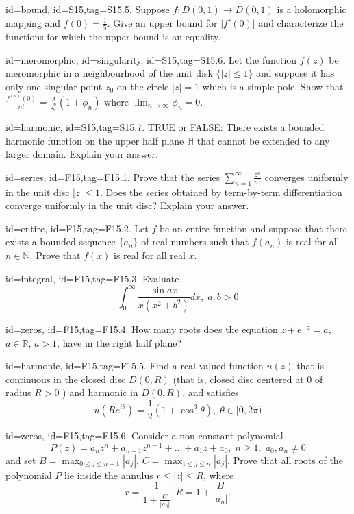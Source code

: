 \documentclass[12pt,letterpaper]{article}
\begin{document}
{\item[id=bound, id=S15,tag=S15.5.]
Suppose $f : D(0,1) \rightarrow D(0,1)$ is a holomorphic mapping and $f(0) = \frac{1}{5}$. Give an upper bound for $| f'(0) |$ and characterize the functions for which the upper bound is an equality.

\item[id=meromorphic, id=singularity, id=S15,tag=S15.6.]
Let the function $f(z)$ be meromorphic in a neighbourhood of the unit disk $\{| z | \le 1\}$ and suppose it has only one singular point $z_0$ on the circle $| z | = 1$ which is a simple pole. Show that $\frac{f^{(n)}(0)}{n!} = \frac{A}{z_0^n}(1 + \phi_n)$ where $\lim_{n\rightarrow \infty} \phi_n = 0$.

\item[id=harmonic, id=S15,tag=S15.7.]
TRUE or FALSE: There exists a bounded harmonic function on the upper half plane $\mathbb{H}$ that cannot be extended to any larger domain. Explain your answer.

\item[id=series, id=F15,tag=F15.1.]
Prove that the series $\sum_{n=1}^{\infty} \frac{z^n}{n^2}$ converges uniformly in the unit disc $| z | \le 1$. Does the series obtained by term-by-term differentiation converge uniformly in the unit disc? Explain your answer.
\item[id=entire, id=F15,tag=F15.2.]
Let $f$ be an entire function and suppose that there exists a bounded sequence $\{a_n\}$ of real numbers such that $f(a_n)$ is real for all $n \in \mathbb{N}$. Prove that $f(x)$ is real for all real $x$.
\item[id=integral, id=F15,tag=F15.3.]
Evaluate
\[
	\int_{0}^{\infty} \frac{\sin ax}{x(x^2 + b^2)} dx, \; a,b > 0
\]

\item[id=zeros, id=F15,tag=F15.4.]
How many roots does the equation $z + e^{-z} = a$, $a \in \mathbb{R}$, $a > 1$, have in the right half plane?

\item[id=harmonic, id=F15,tag=F15.5.]
Find a real valued function $u(z)$ that is continuous in the closed disc $\overline{D(0,R)}$ (that is, closed disc centered at 0 of radius $R > 0$ ) and harmonic in $D(0,R)$, and satisfies
\[
	u(Re^{i\theta}) = \frac{1}{2}(1 + \cos^3\theta), \; \theta \in [0,2\pi)
\]
\item[id=zeros, id=F15,tag=F15.6.]
Consider a non-constant polynomial
\[
	P(z) = a_n z^n + a_{n-1} z^{n-1} + \ldots + a_1 z + a_0, \; n \ge 1, \; a_0, a_n \ne 0
\]
and set $B = \max_{0 \le j \le n - 1} | a_j |$, $C = \max_{1 \le j \le n} | a_j |$. Prove that all roots of the polynomial $P$ lie inside the annulus $r \le | z | \le R$, where
\[
	r = \frac{1}{1 + \frac{C}{| a_0 |}}, R = 1 + \frac{B}{| a_n |}.
\]

}
\end{document}
